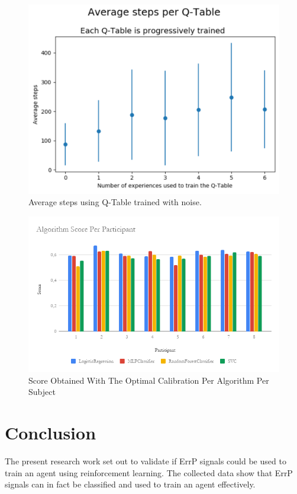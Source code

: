 \documentclass[journal]{IEEEtran}
\begin{document}
\begin{figure}[h!]
\centering
\includegraphics[scale=0.4]{Images/Average_steps/noise.png}
\caption{Average steps using Q-Table trained with noise.}
\label{fig:avg_steps_noise}
\end{figure}


\begin{figure}[h]
    \centering
    \includegraphics[scale=0.4]{Images/algorithm_calibration/Total_calib.png}
    \caption{Score Obtained With The Optimal Calibration Per Algorithm Per Subject}
    \label{diag:algorithm_calibration:subject_calib}
\end{figure}

\section{Conclusion}
The present research work set out to validate if ErrP signals could be used to train an agent using reinforcement learning. The collected data show that ErrP signals can in fact be classified and used to train an agent effectively. 
\end{document}
